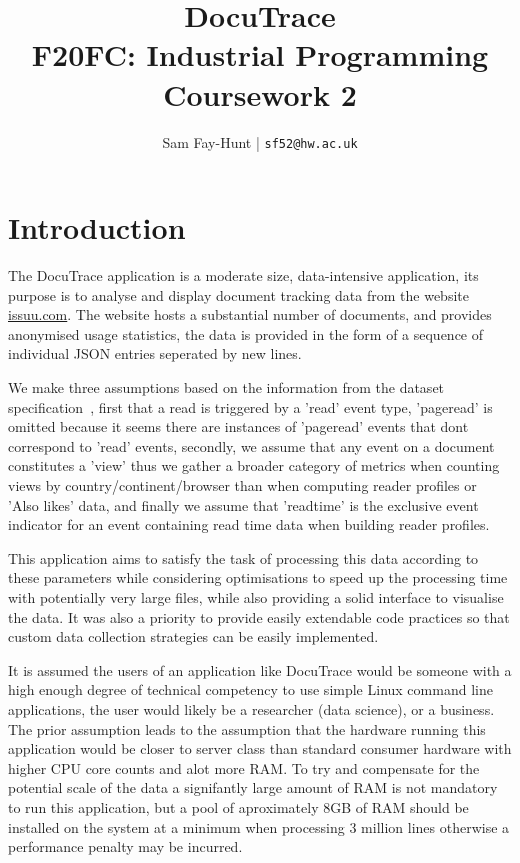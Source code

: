 \documentclass[11pt]{article}
\begin{document}
\title{%
	\bf DocuTrace\\ 
    \large F20FC: Industrial Programming\\
    Coursework 2}

\author{
	Sam Fay-Hunt | \texttt{sf52@hw.ac.uk}
}

\maketitle
\thispagestyle{empty}
\pagebreak


\tableofcontents
\thispagestyle{empty}
\pagebreak


\setcounter{page}{1}

\section{Introduction}
The DocuTrace application is a moderate size, data-intensive application, its purpose is to analyse and display document tracking data from the website \href{https://issuu.com/}{issuu.com}. 
The website hosts a substantial number of documents, and provides anonymised usage statistics, the data is provided in the form of a sequence of individual JSON entries seperated by new lines.

We make three assumptions based on the information from the dataset specification~\autocite{IssuuAnonymousDataset}, first that a read is triggered by a 'read' event type, 'pageread' is omitted because it seems there are instances of 'pageread' events that dont correspond to 'read' events, secondly, we assume that any event on a document constitutes a 'view' thus we gather a broader category of metrics when counting views by country/continent/browser than when computing reader profiles or 'Also likes' data, and finally we assume that 'readtime' is the exclusive event indicator for an event containing read time data when building reader profiles.

This application aims to satisfy the task of processing this data according to these parameters while considering optimisations to speed up the processing time with potentially very large files, while also providing a solid interface to visualise the data.
It was also a priority to provide easily extendable code practices so that custom data collection strategies can be easily implemented.

It is assumed the users of an application like DocuTrace would be someone with a high enough degree of technical competency to use simple Linux command line applications, the user would likely be a researcher (data science), or a business. 
The prior assumption leads to the assumption that the hardware running this application would be closer to server class than standard consumer hardware with higher CPU core counts and alot more RAM.
To try and compensate for the potential scale of the data a signifantly large amount of RAM is not mandatory to run this application, but a pool of aproximately 8GB of RAM should be installed on the system at a minimum when processing 3 million lines otherwise a performance penalty may be incurred.
\end{document}
